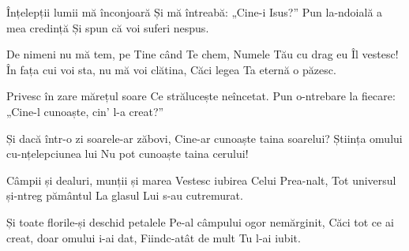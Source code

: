 \beginverse
Înțelepții lumii mă înconjoară
Și mă întreabă: „Cine-i Isus?”
Pun la-ndoială a mea credință
Și spun că voi suferi nespus.
\endverse

\beginchorus
De nimeni nu mă tem, pe Tine când Te chem,
Numele Tău cu drag eu Îl vestesc!
În fața cui voi sta, nu mă voi clătina,
Căci legea Ta eternă o păzesc.
\endchorus

\beginverse
Privesc în zare mărețul soare
Ce strălucește neîncetat.
Pun o-ntrebare la fiecare:
„Cine-l cunoaște, cin' l-a creat?”
\endverse

\beginchorus
Și dacă într-o zi soarele-ar zăbovi,
Cine-ar cunoaște taina soarelui?
Știința omului cu-nțelepciunea lui
Nu pot cunoaște taina cerului!
\endchorus

\beginverse
Câmpii și dealuri, munții și marea
Vestesc iubirea Celui Prea-nalt,
Tot universul și-ntreg pământul
La glasul Lui s-au cutremurat.
\endverse

\beginchorus
Și toate florile-și deschid petalele
Pe-al câmpului ogor nemărginit,
Căci tot ce ai creat, doar omului i-ai dat,
Fiindc-atât de mult Tu l-ai iubit.
\endchorus
\endsong
